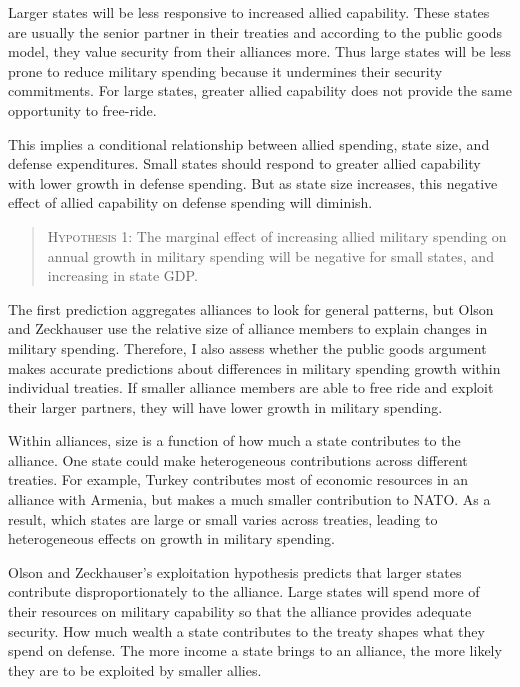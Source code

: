 \documentclass[12pt]{article}
\begin{document}
 
Larger states will be less responsive to increased allied capability. 
These states are usually the senior partner in their treaties and according to the public goods model, they value security from their alliances more. 
Thus large states will be less prone to reduce military spending because it undermines their security commitments. 
For large states, greater allied capability does not provide the same opportunity to free-ride.


This implies a conditional relationship between allied spending, state size, and defense expenditures. 
Small states should respond to greater allied capability with lower growth in defense spending. 
But as state size increases, this negative effect of allied capability on defense spending will diminish. 


\begin{quote}
\textsc{Hypothesis 1}: The marginal effect of increasing allied military spending on annual growth in military spending will be negative for small states, and increasing in state GDP. 
\end{quote}


The first prediction aggregates alliances to look for general patterns, but Olson and Zeckhauser use the relative size of alliance members to explain changes in military spending. 
Therefore, I also assess whether the public goods argument makes accurate predictions about differences in military spending growth within individual treaties. 
If smaller alliance members are able to free ride and exploit their larger partners, they will have lower growth in military spending.  

 
Within alliances, size is a function of how much a state contributes to the alliance.
One state could make heterogeneous contributions across different treaties. 
For example, Turkey contributes most of economic resources in an alliance with Armenia, but makes a much smaller contribution to NATO. 
As a result, which states are large or small varies across treaties, leading to heterogeneous effects on growth in military spending. 


Olson and Zeckhauser's exploitation hypothesis predicts that larger states contribute disproportionately to the alliance. 
Large states will spend more of their resources on military capability so that the alliance provides adequate security. 
How much wealth a state contributes to the treaty shapes what they spend on defense. 
The more income a state brings to an alliance, the more likely they are to be exploited by smaller allies. 
\end{document}
